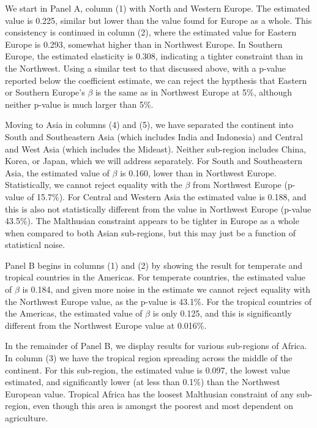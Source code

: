 \documentclass[11pt]{article}
\begin{document}
We start in Panel A, column (1) with North and Western Europe. The estimated value is 0.225, similar but lower than the value found for Europe as a whole. This consistency is continued in column (2), where the estimated value for Eastern Europe is 0.293, somewhat higher than in Northwest Europe. In Southern Europe, the estimated elasticity is 0.308, indicating a tighter constraint than in the Northwest. Using a similar test to that discussed above, with a p-value reported below the coefficient estimate, we can reject the hypthesis that Eastern or Southern Europe's $\beta$ is the same as in Northwest Europe at 5\%, although neither p-value is much larger than 5\%. 

Moving to Asia in columns (4) and (5), we have separated the continent into South and Southeastern Asia (which includes India and Indonesia) and Central and West Asia (which includes the Mideast). Neither sub-region includes China, Korea, or Japan, which we will address separately. For South and Southeastern Asia, the estimated value of $\beta$ is 0.160, lower than in Northwest Europe. Statistically, we cannot reject equality with the $\beta$ from Northwest Europe (p-value of 15.7\%). For Central and Western Asia the estimated value is 0.188, and this is also not statistically different from the value in Northwest Europe (p-value 43.5\%). The Malthusian constraint appears to be tighter in Europe as a whole when compared to both Asian sub-regions, but this may just be a function of statistical noise.

Panel B begins in columns (1) and (2) by showing the result for temperate and tropical countries in the Americas. For temperate countries, the estimated value of $\beta$ is 0.184, and given more noise in the estimate we cannot reject equality with the Northwest Europe value, as the p-value is 43.1\%. For the tropical countries of the Americas, the estimated value of $\beta$ is only 0.125, and this is significantly different from the Northwest Europe value at 0.016\%.

In the remainder of Panel B, we display results for various sub-regions of Africa. In column (3) we have the tropical region spreading across the middle of the continent. For this sub-region, the estimated value is 0.097, the lowest value estimated, and significantly lower (at less than 0.1\%) than the Northwest European value. Tropical Africa has the loosest Malthusian constraint of any sub-region, even though this area is amongst the poorest and most dependent on agriculture.
\end{document}
